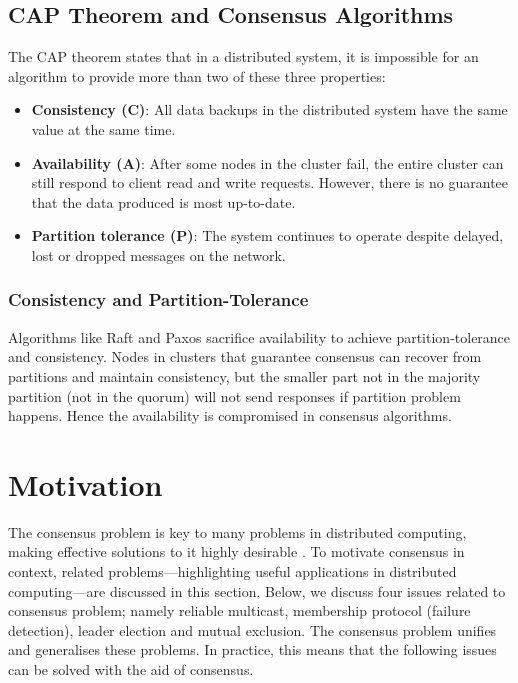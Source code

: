 \documentclass[12pt, a4paper]{article}
\begin{document}
\subsection{CAP Theorem and Consensus Algorithms}
\label{sec:cap-theorem}
The CAP theorem \cite{brewer2012cap} states that in a distributed system,
it is impossible for an algorithm to provide more than two of these three properties:
\begin{itemize}
	\item \textbf{Consistency (C)}: All data backups in the distributed system have
    the same value at the same time.
	\item \textbf{Availability (A)}: After some nodes in the cluster fail, the entire
    cluster can still respond to client read and write requests. However, there
    is no guarantee that the data produced is most up-to-date.
	\item \textbf{Partition tolerance (P)}: The system continues to operate despite
    delayed, lost or dropped messages on the network.
\end{itemize}

\subsubsection{Consistency and Partition-Tolerance}
Algorithms like Raft and Paxos sacrifice availability to achieve partition-tolerance and consistency. Nodes in clusters that guarantee consensus can recover from partitions and maintain consistency, but the smaller part not in the majority partition (not in the quorum) will not send responses if partition problem happens. Hence the availability is compromised in consensus algorithms.


\section{Motivation}
\label{sec:motivation}

The consensus problem is key to many problems in distributed computing, making effective solutions to it highly desirable \cite{fritzke2001consensus}. To motivate consensus in context, related problems—highlighting useful applications in distributed computing—are discussed in this section. Below, we discuss four issues related to consensus problem; namely reliable multicast, membership protocol (failure detection), leader election and mutual exclusion. The consensus problem unifies and generalises these problems. In practice, this means that the following issues can be solved with the aid of consensus.
\end{document}
